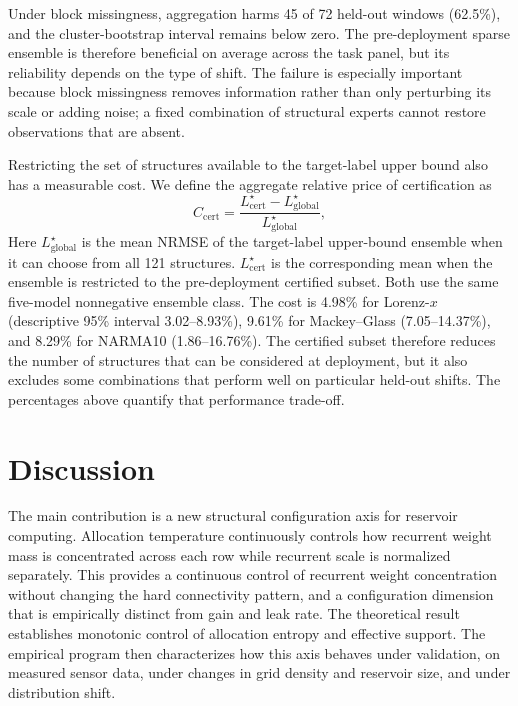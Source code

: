 \documentclass[11pt,a4paper]{article}
\begin{document}
Under block missingness, aggregation harms 45 of 72 held-out windows (62.5\%), and the cluster-bootstrap interval remains below zero. The pre-deployment sparse ensemble is therefore beneficial on average across the task panel, but its reliability depends on the type of shift. The failure is especially important because block missingness removes information rather than only perturbing its scale or adding noise; a fixed combination of structural experts cannot restore observations that are absent.

Restricting the set of structures available to the target-label upper bound also has a measurable cost. We define the aggregate relative price of certification as
\begin{equation}
  C_{\mathrm{cert}}
  =\frac{L^{\star}_{\mathrm{cert}}-L^{\star}_{\mathrm{global}}}
  {L^{\star}_{\mathrm{global}}},
  \label{eq:certification_cost}
\end{equation}
Here $L^{\star}_{\mathrm{global}}$ is the mean NRMSE of the target-label upper-bound ensemble when it can choose from all 121 structures. $L^{\star}_{\mathrm{cert}}$ is the corresponding mean when the ensemble is restricted to the pre-deployment certified subset. Both use the same five-model nonnegative ensemble class. The cost is 4.98\% for Lorenz-$x$ (descriptive 95\% interval 3.02--8.93\%), 9.61\% for Mackey--Glass (7.05--14.37\%), and 8.29\% for NARMA10 (1.86--16.76\%). The certified subset therefore reduces the number of structures that can be considered at deployment, but it also excludes some combinations that perform well on particular held-out shifts. The percentages above quantify that performance trade-off.

\section{Discussion}
\label{sec:discussion}

The main contribution is a new structural configuration axis for reservoir computing. Allocation temperature continuously controls how recurrent weight mass is concentrated across each row while recurrent scale is normalized separately. This provides a continuous control of recurrent weight concentration without changing the hard connectivity pattern, and a configuration dimension that is empirically distinct from gain and leak rate. The theoretical result establishes monotonic control of allocation entropy and effective support. The empirical program then characterizes how this axis behaves under validation, on measured sensor data, under changes in grid density and reservoir size, and under distribution shift.
\end{document}

